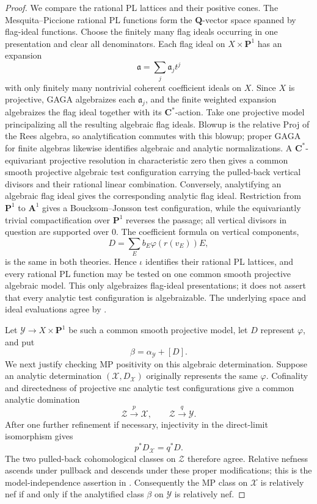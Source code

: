 \begin{proof}
We compare the rational PL lattices and their positive cones.  The
Mesquita--Piccione rational PL functions form the \(\mathbf Q\)-vector
space spanned by flag-ideal functions.  Choose the finitely many flag
ideals occurring in one presentation and clear all denominators.  Each
flag ideal on \(X\times\mathbf P^1\) has an expansion
\[
                    \mathfrak a=\sum_j\mathfrak a_jt^j
\]
with only finitely many nontrivial coherent coefficient ideals on \(X\).
Since \(X\) is projective, GAGA algebraizes each \(\mathfrak a_j\), and
the finite weighted expansion algebraizes the flag ideal together with
its \(\mathbf C^*\)-action.  Take one projective model principalizing all
the resulting algebraic flag ideals.  Blowup is the relative Proj of the
Rees algebra, so analytification commutes with this blowup; proper GAGA for
finite algebras likewise identifies algebraic and analytic normalizations.
A \(\mathbf C^*\)-equivariant projective resolution in characteristic zero
then gives a common smooth projective algebraic test configuration carrying
the pulled-back vertical divisors and their rational linear combination.
Conversely, analytifying an algebraic flag ideal gives the corresponding
analytic flag ideal.  Restriction from \(\mathbf P^1\) to
\(\mathbf A^1\) gives a Boucksom--Jonsson test configuration, while the
equivariantly trivial compactification over \(\mathbf P^1\) reverses the
passage; all vertical divisors in question are supported over \(0\).
The coefficient formula on vertical components,
\[
                    D=\sum_E b_E\varphi(r(v_E))E,
\]
is the same in both theories.  Hence \(\iota\) identifies their rational
PL lattices, and every rational PL function may be tested on one common
smooth projective algebraic model.  This only algebraizes flag-ideal
presentations; it does not assert that every analytic test configuration
is algebraizable.  The underlying space and ideal evaluations agree by
\cite[Remark~1.3.3]{MP24}.

Let \(\mathcal Y\to X\times\mathbf P^1\) be such a common smooth
projective model, let \(D\) represent \(\varphi\), and put
\[
                         \beta=\alpha_{\mathcal Y}+[D].
\]
We next justify checking MP positivity on this algebraic determination.
Suppose an analytic determination
\((\mathcal X,D_{\mathcal X})\) originally represents the same
\(\varphi\).  Cofinality and directedness of projective snc analytic test
configurations \cite[Remark~2.5.2]{MP24} give a common analytic domination
\[
 \mathcal Z\xrightarrow{p}\mathcal X,
 \qquad
 \mathcal Z\xrightarrow{q}\mathcal Y.
\]
After one further refinement if necessary, injectivity in the direct-limit
isomorphism \cite[Theorem~2.6.4]{MP24} gives
\[
                  p^*D_{\mathcal X}=q^*D.
\]
The two pulled-back cohomological classes on \(\mathcal Z\) therefore
agree.  Relative nefness ascends under pullback and descends under these
proper modifications; this is the model-independence assertion in
\cite[Definition~4.1.2 and the proof of Theorem~4.1.5]{MP24}.
Consequently the MP class on \(\mathcal X\) is relatively nef if and only
if the analytified class \(\beta\) on \(\mathcal Y\) is relatively nef.


\end{proof}
